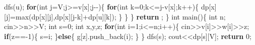 \documentclass[
]{article}
\newenvironment{Shaded}{}{}
\newcommand{\ControlFlowTok}[1]{\textcolor[rgb]{0.00,0.44,0.13}{\textbf{#1}}}
\newcommand{\DataTypeTok}[1]{\textcolor[rgb]{0.56,0.13,0.00}{#1}}
\newcommand{\DecValTok}[1]{\textcolor[rgb]{0.25,0.63,0.44}{#1}}
\newcommand{\NormalTok}[1]{#1}
\newcommand{\OperatorTok}[1]{\textcolor[rgb]{0.40,0.40,0.40}{#1}}
\begin{document}
\begin{Shaded}
\begin{Highlighting}[]
\NormalTok{		dfs}\OperatorTok{(}\NormalTok{u}\OperatorTok{);} 
		\ControlFlowTok{for}\OperatorTok{(}\DataTypeTok{int}\NormalTok{ j}\OperatorTok{=}\NormalTok{V}\OperatorTok{;}\NormalTok{j}\OperatorTok{\textgreater{}=}\NormalTok{v}\OperatorTok{[}\NormalTok{x}\OperatorTok{];}\NormalTok{j}\OperatorTok{{-}{-})\{}
			\ControlFlowTok{for}\OperatorTok{(}\DataTypeTok{int}\NormalTok{ k}\OperatorTok{=}\DecValTok{0}\OperatorTok{;}\NormalTok{k}\OperatorTok{\textless{}=}\NormalTok{j}\OperatorTok{{-}}\NormalTok{v}\OperatorTok{[}\NormalTok{x}\OperatorTok{];}\NormalTok{k}\OperatorTok{++)\{}
\NormalTok{				dp}\OperatorTok{[}\NormalTok{x}\OperatorTok{][}\NormalTok{j}\OperatorTok{]=}\NormalTok{max}\OperatorTok{(}\NormalTok{dp}\OperatorTok{[}\NormalTok{x}\OperatorTok{][}\NormalTok{j}\OperatorTok{],}\NormalTok{dp}\OperatorTok{[}\NormalTok{x}\OperatorTok{][}\NormalTok{j}\OperatorTok{{-}}\NormalTok{k}\OperatorTok{]+}\NormalTok{dp}\OperatorTok{[}\NormalTok{u}\OperatorTok{][}\NormalTok{k}\OperatorTok{]);}
			\OperatorTok{\}}
		\OperatorTok{\}}
	\OperatorTok{\}}
	\ControlFlowTok{return} \OperatorTok{;}
\OperatorTok{\}}
\DataTypeTok{int}\NormalTok{ main}\OperatorTok{()\{}
	\DataTypeTok{int}\NormalTok{ n}\OperatorTok{;}
\NormalTok{	cin}\OperatorTok{\textgreater{}\textgreater{}}\NormalTok{n}\OperatorTok{\textgreater{}\textgreater{}}\NormalTok{V}\OperatorTok{;}
	\DataTypeTok{int}\NormalTok{ s}\OperatorTok{=}\DecValTok{0}\OperatorTok{;}
	\DataTypeTok{int}\NormalTok{ x}\OperatorTok{,}\NormalTok{y}\OperatorTok{,}\NormalTok{z}\OperatorTok{;}
	\ControlFlowTok{for}\OperatorTok{(}\DataTypeTok{int}\NormalTok{ i}\OperatorTok{=}\DecValTok{1}\OperatorTok{;}\NormalTok{i}\OperatorTok{\textless{}=}\NormalTok{n}\OperatorTok{;}\NormalTok{i}\OperatorTok{++)\{}
\NormalTok{		cin}\OperatorTok{\textgreater{}\textgreater{}}\NormalTok{v}\OperatorTok{[}\NormalTok{i}\OperatorTok{]\textgreater{}\textgreater{}}\NormalTok{w}\OperatorTok{[}\NormalTok{i}\OperatorTok{]\textgreater{}\textgreater{}}\NormalTok{z}\OperatorTok{;}
		\ControlFlowTok{if}\OperatorTok{(}\NormalTok{z}\OperatorTok{=={-}}\DecValTok{1}\OperatorTok{)\{}
\NormalTok{			s}\OperatorTok{=}\NormalTok{i}\OperatorTok{;}
		\OperatorTok{\}}\ControlFlowTok{else}\OperatorTok{\{}
\NormalTok{			g}\OperatorTok{[}\NormalTok{z}\OperatorTok{].}\NormalTok{push\_back}\OperatorTok{(}\NormalTok{i}\OperatorTok{);}
		\OperatorTok{\}}
	\OperatorTok{\}}
\NormalTok{	dfs}\OperatorTok{(}\NormalTok{s}\OperatorTok{);}
\NormalTok{	cout}\OperatorTok{\textless{}\textless{}}\NormalTok{dp}\OperatorTok{[}\NormalTok{s}\OperatorTok{][}\NormalTok{V}\OperatorTok{];}
	\ControlFlowTok{return} \DecValTok{0}\OperatorTok{;}

\end{Highlighting}
\end{Shaded}
\end{document}
